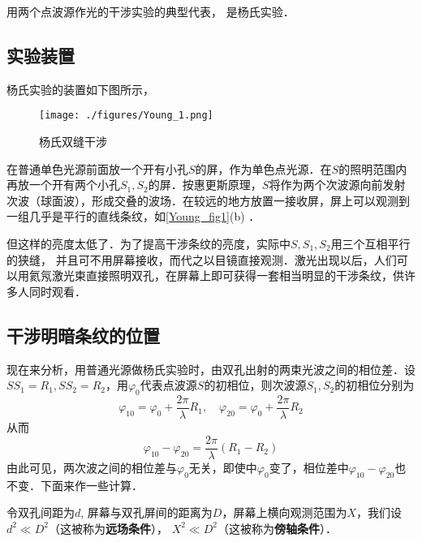 

用两个点波源作光的干涉实验的典型代表， 是杨氏实验．
\subsection{实验装置}
杨氏实验的装置如下图所示，
\begin{figure}[ht]
\centering
\texttt{[image: ./figures/Young\_1.png]}
\caption{杨氏双缝干涉} \label{Young_fig1}
\end{figure}
在普通单色光源前面放一个开有小孔$S$的屏，作为单色点光源．在$S $的照明范围内再放一个开有两个小孔$S_1,S_2$的屏．按惠更斯原理，$S$将作为两个次波源向前发射次波（球面波），形成交叠的波场．在较远的地方放置一接收屏，屏上可以观测到一组几乎是平行的直线条纹，如\autoref{Young_fig1}(b) ．

但这样的亮度太低了．为了提高干涉条纹的亮度，实际中$S,S_1,S_2$用三个互相平行的狭缝，%
并且可不用屏幕接收，而代之以目镜直接观测．激光出现以后，人们可以用氦氖激光束直接照明双孔，在屏幕上即可获得一套相当明显的干涉条纹，供许多人同时观看．

\subsection{干涉明暗条纹的位置}
现在来分析，用普通光源做杨氏实验时，由双孔出射的两束光波之间的相位差．设$SS_1=R_1,SS_2=R_2$，用$\varphi_0$代表点波源$S$的初相位，则次波源$S_1,S_2$的初相位分别为
\begin{equation}
\varphi_{10}=\varphi_{0}+\frac{2 \pi}{\lambda} R_{1}, \quad \varphi_{20}=\varphi_{0}+\frac{2 \pi}{\lambda} R_{2}
\end{equation}
从而
\begin{equation}
\varphi_{10}-\varphi_{20}=\frac{2 \pi}{\lambda}\left(R_{1}-R_{2}\right)
\end{equation}
由此可见，两次波之间的相位差与$\varphi_0$无关，即使中$\varphi_0$变了，相位差中$\varphi_{10}-\varphi_{20}$也不变．下面来作一些计算．

令双孔间距为$d$, 屏幕与双孔屏间的距离为$D$，屏幕上横向观测范围为$X$，我们设$d^{2} \ll D^{2}$（这被称为\textbf{远场条件}）， $X^{2} \ll D^{2}$（这被称为\textbf{傍轴条件}）．


